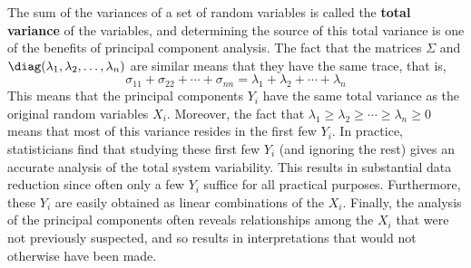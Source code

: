 The sum of the variances of a set of random variables is called the \textbf{total variance} of the variables, and determining the source of this total variance is one of the benefits of principal component analysis. The fact that the matrices $\Sigma$ and $\diag(\lambda_{1}, \lambda_{2}, \dots, \lambda_{n})$ are similar means that they have the same trace, that is,
\begin{equation*}
\sigma_{11} + \sigma_{22} + \cdots + \sigma_{nn} = \lambda_{1} + \lambda_{2} + \cdots + \lambda_{n}
\end{equation*}
This means that the principal components $Y_{i}$ have the same total variance as the original random variables $X_{i}$. Moreover, the fact that $\lambda_{1} \geq \lambda_{2} \geq \cdots \geq \lambda_{n} \geq 0$ means that most of this variance resides in the first few $Y_{i}$. In practice, statisticians find that studying these first few $Y_{i}$ (and ignoring the rest) gives an accurate analysis of the total system variability. This results in substantial data reduction since often only a few $Y_{i}$ suffice for all practical purposes. Furthermore, these $Y_{i}$ are easily obtained as linear combinations of the $X_{i}$. Finally, the analysis of the principal components often reveals relationships among the $X_{i}$ that were not previously suspected, and so results in interpretations that would not otherwise have been made.





